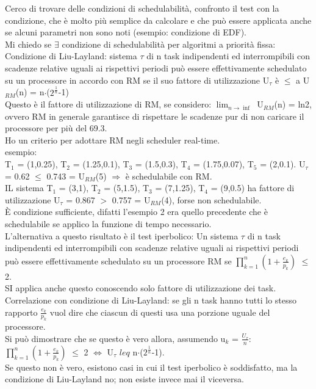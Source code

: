 \documentclass[12pt, oneside]{extbook}
\begin{document}
Cerco di trovare delle condizioni di schedulabilità, confronto il test con la condizione, che è molto più semplice da calcolare e che può essere applicata anche se alcuni parametri non sono noti (esempio: condizione di EDF).\\ Mi chiedo se $\exists$ condizione di schedulabilità per algoritmi a priorità fissa:\\ Condizione di Liu-Layland: sistema $\tau$ di n task indipendenti ed interrompibili con scadenze relative uguali ai rispettivi periodi può essere effettivamente schedulato su un processore in accordo con RM se il suo fattore di utilizzazione U$_{\tau}$ è $\leq$ a U$_{RM}$(n) = n$\cdot$($2^{\frac{1}{n}}$-1)\\ Questo è il fattore di utilizzazione di RM, se considero: $\lim_{n \to \inf}$ U$_{RM}$(n) = ln2, ovvero RM in generale garantisce di rispettare le scadenze pur di non caricare il processore per più del 69.3.\\ Ho un criterio per adottare RM negli scheduler real-time.\\ esempio:\\ T$_{1}$ = (1,0.25), T$_{2}$ = (1.25,0.1), T$_{3}$ = (1.5,0.3), T$_{4}$ = (1.75,0.07), T$_{5}$ = (2,0.1). U$_{\tau}$ = 0.62 $\leq$ 0.743 = U$_{RM}$(5) $\Rightarrow$ è schedulabile con RM.\\ IL sistema T$_{1}$ = (3,1), T$_{2}$ = (5,1.5), T$_{3}$ = (7,1.25), T$_{4}$ = (9,0.5) ha fattore di utilizzazione U$_{\tau}$ = 0.867 $>$ 0.757 = U$_{RM}$(4),  forse non schedulabile.\\ È condizione sufficiente, difatti l'esempio 2 era quello precedente che è schedulabile se applico la funzione di tempo necessario.\\ L'alternativa a questo risultato è il test iperbolico: Un sistema $\tau$ di n task indipendenti ed interrompibili con scadenze relative uguali ai rispettivi periodi può essere effettivamente schedulato su un processore RM se $\prod\limits_{k=1}^{n}(1 + \frac{e_{k}}{p_{k}})$ $\leq$ 2.\\ SI applica anche questo conoscendo solo fattore di utilizzazione dei task. \\ Correlazione con condizione di Liu-Layland: se gli n task hanno tutti lo stesso rapporto $\frac{e_{k}}{p_{k}}$ vuol dire che ciascun di questi usa una porzione uguale del processore. \\ Si può dimostrare che se questo è vero allora, assumendo u$_{k}$ = $\frac{U_{\tau}}{n}$:\\
$\prod\limits_{k=1}^{n}(1 + \frac{e_{k}}{p_{k}})$ $\leq$ 2 $\Leftrightarrow$ U$_{\tau}$ $leq$ n$\cdot$($2^{\frac{1}{n}}$-1). \\Se questo non è vero, esistono casi in cui il test iperbolico è soddisfatto, ma la condizione di Liu-Layland no; non esiste invece mai il viceversa.\\
\end{document}
